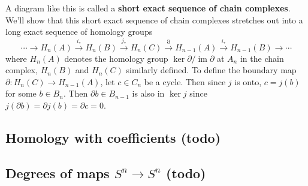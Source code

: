 \begin{figure}[H]
\centering
{}
\end{figure}
A diagram like this is called a \textbf{short exact sequence of chain complexes}. We'll show that this short exact sequence of chain complexes stretches out into a long exact sequence of homology groups \[
    \cdots \to H_n (A) \overset{i_*}{\longrightarrow} H_n (B) \overset{j_*}{\longrightarrow} H_n (C) \overset{\partial }{\longrightarrow} H_{n-1}(A)\overset{i_*}{\longrightarrow} H_{n-1}(B)\to \cdots 
\] where $H_n(A)$ denotes the homology group $\ker \partial  / \operatorname{im}\partial $ at $A_n $ in the chain complex, $H_n (B)$ and $H_n (C)$ similarly defined. To define the boundary map $\partial \colon H_n (C) \to H_{n-1}(A)$, let $c\in C_n $ be a cycle. Then since $j$ is onto, $c=j(b)$ for some $b\in B_n $. Then $\partial b\in B_{n-1}$ is also in $\ker j$ since $j(\partial b)=\partial j(b)=\partial c=0$. 

\subsection{Homology with coefficients (todo)}
\subsection{Degrees of maps $S^n \to S^n $ (todo)}

